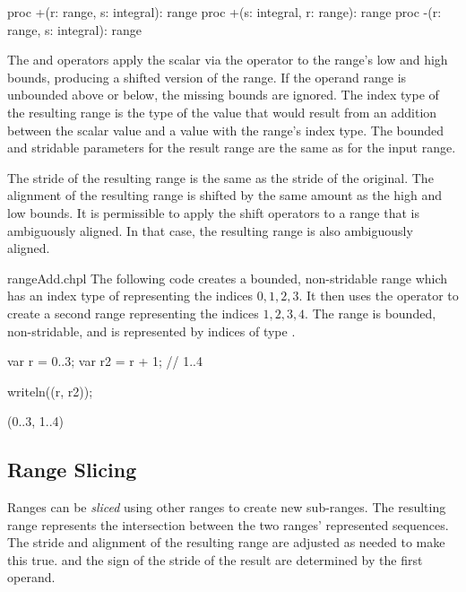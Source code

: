 \begin{chapel}
proc +(r: range, s: integral): range
proc +(s: integral, r: range): range
proc -(r: range, s: integral): range
\end{chapel}

The \chpl{+} and \chpl{-} operators apply the scalar via the operator
to the range's low and high bounds, producing a shifted version of the
range.  If the operand range is unbounded above or below, the missing bounds
are ignored.
The index type of the resulting range is the type of the value
that would result from an addition between the scalar value and a value
with the range's index type.  The bounded and stridable parameters for
the result range are the same as for the input range.

The stride of the resulting range is the same as the stride of the
original. The alignment of the resulting range is shifted by the same amount as
the high and low bounds.  It is permissible to apply the shift operators to a
range that is ambiguously aligned.  In that case, the resulting range is also
ambiguously aligned.

\begin{chapelexample}{rangeAdd.chpl}
The following code creates a bounded, non-stridable range 
which has an index type of  representing the indices ${0, 1, 2, 3}$.  
It then uses the \chpl{+} operator to create a second range 
representing the indices ${1, 2, 3, 4}$.  The  range is bounded,
non-stridable, and is represented by indices of type .
\begin{chapel}
var r = 0..3;
var r2 = r + 1;    // 1..4
\end{chapel}
\begin{chapelpost}
writeln((r, r2));
\end{chapelpost}
\begin{chapeloutput}
(0..3, 1..4)
\end{chapeloutput}
\end{chapelexample}


\subsection{Range Slicing}
\label{Range_Slicing}

Ranges can be \emph{sliced} using other ranges to create new
sub-ranges.  The resulting range represents the intersection between
the two ranges' represented sequences.  The stride and alignment of the resulting range are adjusted as
needed to make this true.
 and the sign of the stride of the result are determined
by the first operand.

